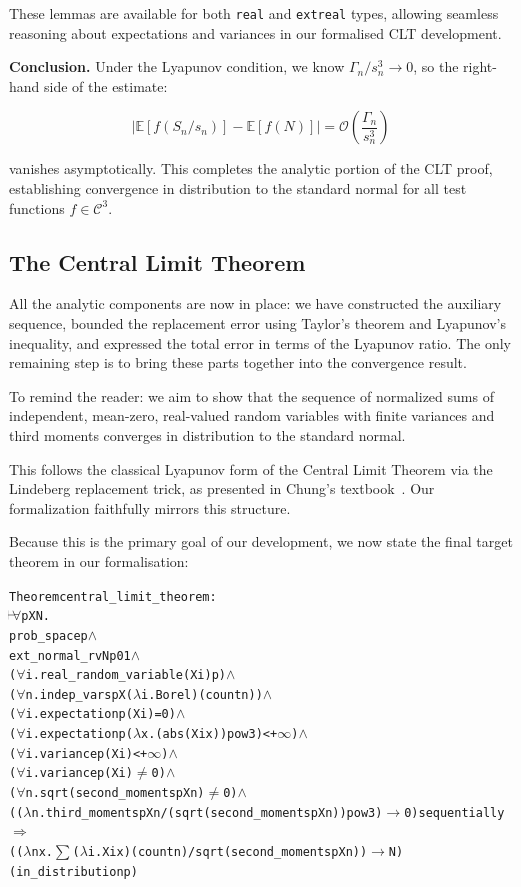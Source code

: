 These lemmas are available for both \texttt{real} and \texttt{extreal} types, allowing seamless reasoning about expectations and variances in our formalised CLT development.


\medskip
\noindent
\textbf{Conclusion.} Under the Lyapunov condition, we know \( \Gamma_n / s_n^3 \to 0 \), so the right-hand side of the estimate:

\[
\left| \mathbb{E}[f(S_n / s_n)] - \mathbb{E}[f(N)] \right| = \mathcal{O}\left( \frac{\Gamma_n}{s_n^3} \right)
\]

vanishes asymptotically. This completes the analytic portion of the CLT proof, establishing convergence in distribution to the standard normal for all test functions \( f \in \mathcal{C}^3 \).

\subsection{The Central Limit Theorem}

All the analytic components are now in place: we have constructed the auxiliary sequence, bounded the replacement error using Taylor's theorem and Lyapunov's inequality, and expressed the total error in terms of the Lyapunov ratio. The only remaining step is to bring these parts together into the convergence result.

To remind the reader: we aim to show that the sequence of normalized sums of independent, mean-zero, real-valued random variables with finite variances and third moments converges in distribution to the standard normal.

This follows the classical Lyapunov form of the Central Limit Theorem via the Lindeberg replacement trick, as presented in Chung’s textbook~\cite{Chung:2001}. Our formalization faithfully mirrors this structure.

\medskip

Because this is the primary goal of our development, we now state the final target theorem in our formalisation:

\begin{hol}
  \begin{alltt}
    Theorem central\_limit\_theorem :
    \(\!\!\!{\turn}\!\!\!\!\) \(\forall\)p X N.
    prob\_space p \(\land\)
    ext\_normal\_rv N p 0 1 \(\land\)
    (\(\forall\)i. real\_random\_variable (X i) p) \(\land\)
    (\(\forall\)n. indep\_vars p X (\(\lambda\)i. Borel) (count n)) \(\land\)
    (\(\forall\)i. expectation p (X i) = 0) \(\land\)
    (\(\forall\)i. expectation p (\(\lambda\)x. (abs (X i x)) pow 3) < +\(\infty\)) \(\land\)
    (\(\forall\)i. variance p (X i) < +\(\infty\)) \(\land\)
    (\(\forall\)i. variance p (X i) \(\ne\) 0) \(\land\)
    (\(\forall\)n. sqrt (second\_moments p X n) \(\ne\) 0) \(\land\)
    ((\(\lambda\)n. third\_moments p X n / (sqrt (second\_moments p X n)) pow 3) \(\longrightarrow\) 0) sequentially
    \(\Rightarrow\)
    ((\(\lambda\)n x. \(\sum\) (\(\lambda\)i. X i x) (count n) / sqrt (second\_moments p X n)) \(\longrightarrow\) N)
    (in\_distribution p)
  \end{alltt}
\end{hol}


